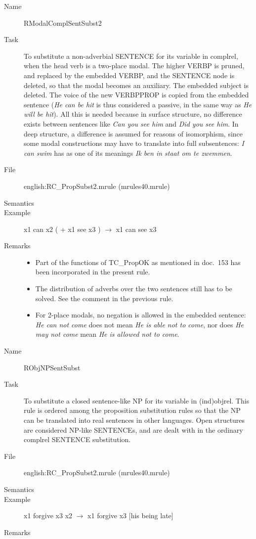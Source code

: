 \begin{description}
\vspace{1 cm}
\begin{description}
\item[Name] RModalComplSentSubst2
\item[Task] To substitute a non-adverbial SENTENCE for its variable in 
complrel, when the head verb is a two-place modal. The higher VERBP is pruned, 
and replaced by the embedded VERBP, and the SENTENCE node is deleted, so that 
the modal becomes an auxiliary. The embedded subject is deleted. 
The voice of the new VERBPPROP is copied from 
the embedded sentence ({\em He can be hit\/} is thus considered a passive, in 
the same way as {\em He will be hit\/}). All 
this is needed because in surface structure, no difference exists between 
sentences like {\em Can you see him\/} and {\em Did you see him\/}. In deep 
structure, a difference is assumed for reasons of isomorphism, since some modal 
constructions may have to translate into full subsentences: {\em I can swim\/} 
has as one of its meanings {\em Ik ben in staat om te zwemmen\/}.
\item[File] english:RC\_PropSubst2.mrule (mrules40.mrule)
\item[Semantics]
\item[Example] x1 can x2 ( + x1 see x3 ) $\rightarrow$ x1 can see x3
\item[Remarks] \mbox{}
\begin{itemize}
\item Part of the functions of TC\_PropOK as mentioned in doc.\ 153 has 
been incorporated in the present rule.
\item The distribution of adverbs over the two sentences still has to 
be solved. See the comment in the previous rule.
\item For 2-place modals, no negation is allowed in the embedded sentence: 
{\em He can not come\/} does not mean {\em He is able not to come\/}, nor does 
{\em He may not come\/} mean {\em He is allowed not to come\/}.
\end{itemize}

\end{description}

\vspace{1 cm}
\begin{description}
\item[Name]   RObjNPSentSubst
\item[Task] To substitute a closed sentence-like NP for its variable in 
(ind)objrel. This rule is ordered among the proposition substitution rules so 
that the NP can be translated into real sentences in other languages. Open 
structures are considered NP-like SENTENCEs, and are dealt with in the ordinary 
complrel SENTENCE substitution.
\item[File] english:RC\_PropSubst2.mrule (mrules40.mrule)
\item[Semantics]
\item[Example] x1 forgive x3 x2 $\rightarrow$ x1 forgive x3 [his being late]
\item[Remarks]
\end{description}


\end{description}
